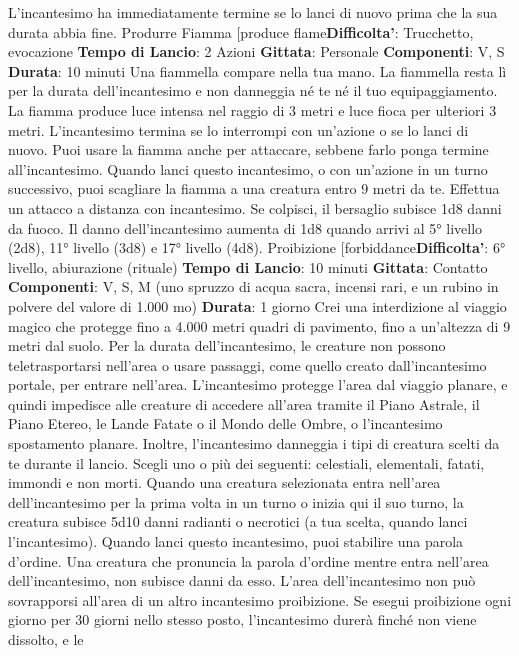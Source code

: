 \begin{multicols}{2}
L’incantesimo ha immediatamente termine se lo lanci di
nuovo prima che la sua durata abbia fine.
Produrre Fiamma
[produce flame\textbf{Difficolta'}:
Trucchetto, evocazione
\textbf{Tempo di Lancio}: 2 Azioni
\textbf{Gittata}: Personale
\textbf{Componenti}: V, S
\textbf{Durata}: 10 minuti
Una fiammella compare nella tua mano. La fiammella
resta lì per la durata dell’incantesimo e non danneggia
né te né il tuo equipaggiamento. La fiamma produce
luce intensa nel raggio di 3 metri e luce fioca per
ulteriori 3 metri. L’incantesimo termina se lo interrompi
con un’azione o se lo lanci di nuovo.
Puoi usare la fiamma anche per attaccare, sebbene
farlo ponga termine all’incantesimo. Quando lanci
questo incantesimo, o con un’azione in un turno
successivo, puoi scagliare la fiamma a una creatura
entro 9 metri da te. Effettua un attacco a distanza con
incantesimo. Se colpisci, il bersaglio subisce 1d8 danni
da fuoco.
Il danno dell’incantesimo aumenta di 1d8 quando arrivi
al 5° livello (2d8), 11° livello (3d8) e 17° livello (4d8).
Proibizione
[forbiddance\textbf{Difficolta'}:
6° livello, abiurazione (rituale)
\textbf{Tempo di Lancio}: 10 minuti
\textbf{Gittata}: Contatto
\textbf{Componenti}: V, S, M (uno spruzzo di acqua sacra,
incensi rari, e un rubino in polvere del valore di 1.000
mo)
\textbf{Durata}: 1 giorno
Crei una interdizione al viaggio magico che protegge
fino a 4.000 metri quadri di pavimento, fino a un’altezza
di 9 metri dal suolo. Per la durata dell’incantesimo, le
creature non possono teletrasportarsi nell’area o usare
passaggi, come quello creato dall’incantesimo portale,
per entrare nell’area. L’incantesimo protegge l’area dal
viaggio planare, e quindi impedisce alle creature di
accedere all’area tramite il Piano Astrale, il Piano
Etereo, le Lande Fatate o il Mondo delle Ombre, o
l’incantesimo spostamento planare.
Inoltre, l’incantesimo danneggia i tipi di creatura scelti
da te durante il lancio. Scegli uno o più dei seguenti:
celestiali, elementali, fatati, immondi e non morti.
Quando una creatura selezionata entra nell’area
dell’incantesimo per la prima volta in un turno o inizia
qui il suo turno, la creatura subisce 5d10 danni radianti
o necrotici (a tua scelta, quando lanci l’incantesimo).
Quando lanci questo incantesimo, puoi stabilire una
parola d’ordine. Una creatura che pronuncia la parola
d’ordine mentre entra nell’area dell’incantesimo, non
subisce danni da esso.
L’area dell’incantesimo non può sovrapporsi all’area di
un altro incantesimo proibizione. Se esegui proibizione
ogni giorno per 30 giorni nello stesso posto,
l’incantesimo durerà finché non viene dissolto, e le

\end{multicols}
